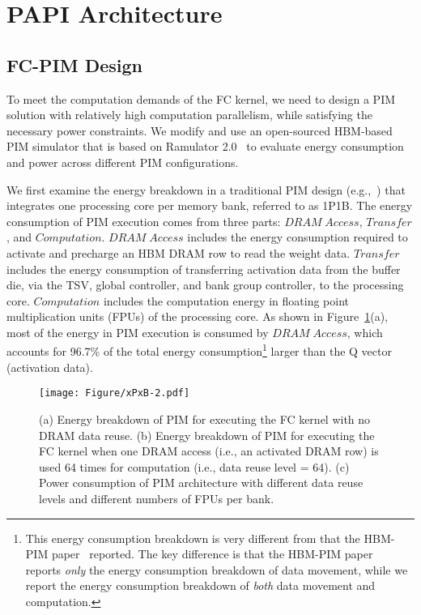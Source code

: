 \section{PAPI Architecture}


\subsection{FC-PIM Design}
To meet the computation demands of the FC kernel, we need to design a PIM solution with relatively high computation parallelism, while satisfying the necessary power constraints. We modify and use an open-sourced HBM-based PIM simulator \cite{park2024attacc} that is based on Ramulator 2.0~\cite{luo2023ramulator, kim2015ramulator} to evaluate energy consumption and power across different PIM configurations.

We first examine the energy breakdown in a traditional PIM design (e.g.,~\cite{park2024attacc}) that integrates one processing core per memory bank, referred to as 1P1B.
The energy consumption of PIM execution comes from three parts: $DRAM\; Access$, $Transfer$, and $Computation$. $DRAM\; Access$ includes the energy consumption required to activate and precharge an HBM DRAM row to read the weight data.
$Transfer$ includes the energy consumption of transferring activation data from the buffer die, via the TSV, global controller, and bank group controller, to the processing core.
$Computation$ includes the computation energy in floating point multiplication units (FPUs) of the processing core.
As shown in Figure~\ref{fig:xPxB}(a), most of the energy in PIM execution is consumed by \emph{$DRAM\; Access$}, which accounts for 96.7\% of the total energy consumption\footnote{This energy consumption breakdown is very different from that the HBM-PIM paper~\cite{lee2021hardware} reported. The key difference is that the HBM-PIM paper~\cite{lee2021hardware} reports \emph{only} the energy consumption breakdown of data movement, while we report the energy consumption breakdown of \emph{both} data movement and computation.} larger than the Q vector (activation data).

\begin{figure}[!t]

\centering
\texttt{[image: Figure/xPxB-2.pdf]}
\caption{(a) Energy breakdown of PIM for executing the FC kernel with no DRAM data reuse. (b) Energy breakdown of PIM for executing the FC kernel when one DRAM access (i.e., an activated DRAM row) is used 64 times for computation (i.e., data reuse level = 64). (c) Power consumption of PIM architecture with different data reuse levels and different numbers of FPUs per bank.}
\label{fig:xPxB} 

\end{figure} 




